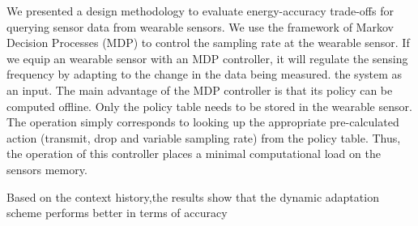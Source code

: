 \documentclass[letterpaper, 10pt, conference]{IEEEtran} %
\begin{document}
We presented a design methodology to
evaluate energy-accuracy trade-offs for querying sensor data from wearable sensors.
We use the framework of Markov Decision Processes
(MDP) to control the sampling rate at the wearable sensor. If we equip an wearable sensor with an MDP
controller, it will regulate the sensing frequency by adapting to the change in the data being measured. the
system as an input.  The main advantage of the MDP controller is that its policy can be computed offline. Only the policy table needs to be stored in the wearable sensor. The operation simply corresponds to looking up the appropriate pre-calculated action (transmit, drop and variable sampling rate) from the policy table. Thus, the operation of this controller places a minimal computational load
on the sensors memory.


Based on the context
history,the results show that the dynamic adaptation
scheme performs better in terms of accuracy
\FloatBarrier 

\renewcommand*{\bibfont}{\small}

\printbibliography
 
\end{document}
